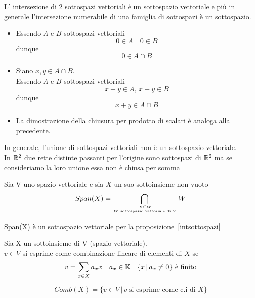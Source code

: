 \begin{prop}\label{intsottospazi}
L' intersezione di 2 sottospazi vettoriali è un sottospazio vettoriale e pi\`u in generale l'intersezione numerabile di una famiglia di sottospazi \`e un sottospazio.
\proof \bbianco
\begin{itemize}
\item Essendo  $A$ e $B$ sottospazi vettoriali
 $$0 \in A \quad  0 \in B$$ 
dunque $$ 0 \in A \cap B$$
\item Siano $x,y \in A\cap B $.\\
Essendo $A$ e $B$ sottospazi vettoriali
 $$  x+y \in A, \,x+y \in B $$
 dunque $$ x+y \in A \cap B$$
 
\item La dimostrazione della chiusura per prodotto di scalari è analoga alla precedente.
\end{itemize}
\endproof
\end{prop}

\begin{oss}
In generale, l'unione di sottospazi vettoriali non è un sottospazio vettoriale.\\
In $\mathbb{R}^2$  due rette distinte passanti per l'origine sono sottospazi di $\mathbb{R}^2$ ma se consideriamo la loro unione essa non \`e chiusa per somma
\end{oss}
\newpage

\begin{defn}[Span X]\bianco
Sia V uno spazio vettoriale e sia $X$ un suo sottoinsieme non vuoto
$$ Span(X)= \bigcap_{ \, X \subseteq W \atop{ W \text{ sottospazio vettoriale di } V}} W $$
\begin{oss}
Span(X) è un sottospazio vettoriale per la proposizione~\ref{intsottospazi}
\end{oss}
\end{defn}
\spazio

\begin{defn}\bianco
Sia X un sottoinsieme di V (spazio vettoriale).\\
$v \in V $ si esprime come combinazione lineare di elementi di $X$ se 
$$v=\sum _{x \in X} a_x x \quad   a_x \in \mathbb{K}  \quad  \{ x \, \vert \, a_x\neq 0 \} \text{ \`e finito}   $$
\end{defn}

\begin{defn}[Comb X]
$$ Comb(X)= \{ v \in V  \, \vert \, v \text{ si esprime come c.i di }  X \}$$
\end{defn}

